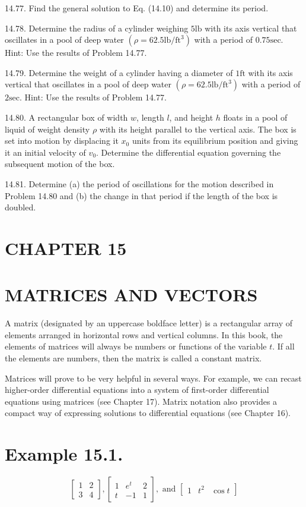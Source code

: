\documentclass[10pt]{article}
\begin{document}
14.77. Find the general solution to Eq. (14.10) and determine its period.

14.78. Determine the radius of a cylinder weighing $5 \mathrm{lb}$ with its axis vertical that oscillates in a pool of deep water $\left(\rho=62.5 \mathrm{lb} / \mathrm{ft}^{3}\right)$ with a period of $0.75 \mathrm{sec}$. Hint: Use the results of Problem 14.77.

14.79. Determine the weight of a cylinder having a diameter of $1 \mathrm{ft}$ with its axis vertical that oscillates in a pool of deep water $\left(\rho=62.5 \mathrm{lb} / \mathrm{ft}^{3}\right)$ with a period of $2 \mathrm{sec}$. Hint: Use the results of Problem 14.77.

14.80. A rectangular box of width $w$, length $l$, and height $h$ floats in a pool of liquid of weight density $\rho$ with its height parallel to the vertical axis. The box is set into motion by displacing it $x_{0}$ units from its equilibrium position and giving it an initial velocity of $v_{0}$. Determine the differential equation governing the subsequent motion of the box.

14.81. Determine (a) the period of oscillations for the motion described in Problem 14.80 and (b) the change in that period if the length of the box is doubled.

\section*{CHAPTER 15}
\section*{MATRICES AND VECTORS}
A matrix (designated by an uppercase boldface letter) is a rectangular array of elements arranged in horizontal rows and vertical columns. In this book, the elements of matrices will always be numbers or functions of the variable $t$. If all the elements are numbers, then the matrix is called a constant matrix.

Matrices will prove to be very helpful in several ways. For example, we can recast higher-order differential equations into a system of first-order differential equations using matrices (see Chapter 17). Matrix notation also provides a compact way of expressing solutions to differential equations (see Chapter 16).

\section*{Example 15.1.}
$$
\left[\begin{array}{ll}
1 & 2 \\
3 & 4
\end{array}\right],\left[\begin{array}{ccc}
1 & e^{t} & 2 \\
t & -1 & 1
\end{array}\right], \text { and }\left[\begin{array}{lll}
1 & t^{2} & \cos t
\end{array}\right]
$$
\end{document}
